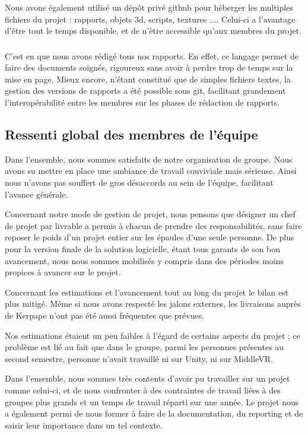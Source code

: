 Nous avons également utilisé un dépôt privé github pour héberger les multiples fichiers du projet : rapports, objets 3d, scripts, textures ....
Celui-ci a l'avantage d'être tout le temps disponible, et de n'être accessible qu'aux membres du projet.

\subsubsection{\Latex}

C'est en \Latex que nous avons rédigé tous nos rapports.
En effet, ce langage permet de faire des documents soignés, rigoureux sans avoir à perdre trop de temps sur la mise en page.
Mieux encore, \Latex n'étant constitué que de simples fichiers textes, la gestion des versions de rapports a été possible sous git, facilitant grandement l'interopérabilité entre les membres sur les phases de rédaction de rapports.

\subsection{Ressenti global des membres de l'équipe}

Dans l'ensemble, nous sommes satisfaits de notre organisation de groupe. 
Nous avons su mettre en place une ambiance de travail conviviale mais sérieuse. 
Ainsi nous n'avons pas souffert de gros désaccords au sein de l'équipe, facilitant l'avance générale.

Concernant notre mode de gestion de projet, nous pensons que désigner un chef de projet par livrable a permis à chacun de prendre des responsabilités, sans faire reposer le poids d'un projet entier sur les épaules d'une seule personne.
De plus pour la version finale de la solution logicielle, étant tous garants de son bon avancement, nous nous sommes mobilisés y compris dans des périodes moins propices à avancer sur le projet.

Concernant les estimations et l'avancement tout au long du projet le bilan est plus mitigé.
Même si nous avons respecté les jalons externes, les livraisons auprès de Kerpape n'ont pas été aussi fréquentes que prévues.
 
Nos estimations étaient un peu faibles à l'égard de certains aspects du projet ; ce problème est lié au fait que dans le groupe, parmi les personnes présentes au second semestre, personne n'avait travaillé ni sur Unity, ni sur MiddleVR.

Dans l'ensemble, nous sommes très contents d'avoir pu travailler sur un projet comme celui-ci, et de nous confronter à des contraintes de travail liées à des groupes plus grands et un temps de travail réparti sur une année.
Le projet nous a également permi de nous former à faire de la documentation, du reporting et de saisir leur importance dans un tel contexte. 